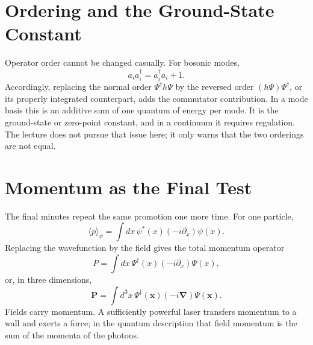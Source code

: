 \section{Ordering and the Ground-State Constant}

Operator order cannot be changed casually. For bosonic modes,
\begin{equation}
a_i a_i^\dagger=a_i^\dagger a_i+1.
\end{equation}
Accordingly, replacing the normal order \(\Psi^\dagger h\Psi\) by the reversed order \((h\Psi)\Psi^\dagger\), or its properly integrated counterpart, adds the commutator contribution. In a mode basis this is an additive sum of one quantum of energy per mode. It is the ground-state or zero-point constant, and in a continuum it requires regulation. The lecture does not pursue that issue here; it only warns that the two orderings are not equal.

\begin{classroomqa}
\end{classroomqa}

\section{Momentum as the Final Test}

The final minutes repeat the same promotion one more time. For one particle,
\begin{equation}
\langle p\rangle_\psi
=\int dx\,\psi^*(x)\left(-i\partial_x\right)\psi(x).
\label{eq:l07-one-particle-momentum}
\end{equation}
Replacing the wavefunction by the field gives the total momentum operator
\begin{equation}
P=\int dx\,\Psi^\dagger(x)\left(-i\partial_x\right)\Psi(x),
\label{eq:l07-field-momentum}
\end{equation}
or, in three dimensions,
\begin{equation}
\mathbf P=\int d^3x\,\Psi^\dagger(\mathbf x)
\left(-i\boldsymbol\nabla\right)\Psi(\mathbf x).
\end{equation}
Fields carry momentum. A sufficiently powerful laser transfers momentum to a wall and exerts a force; in the quantum description that field momentum is the sum of the momenta of the photons.

